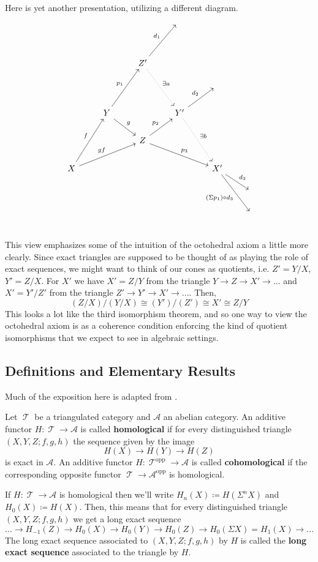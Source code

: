 \documentclass[11pt]{article}
\DeclareMathOperator{\TT}{\mathcal{T}}
\begin{document}
Here is yet another presentation, utilizing a different diagram. 
\[\begin{tikzcd}
  &   &   & {} & &  \\
  &   &   &   &   &  \\
  &   & Z' \ar[ruu,"d_1"]\ar[ddr,"\exists a",dotted] &   &  &  \\
  &   &   &   & {}  &  \\
  & Y\ar[rd,"g"] \ar[ruu,"p_1"] &   & Y'\ar[ru,"d_2"] \ar[rdd,"\exists b", dotted]&   &  \\
  &   & Z \ar[ru,"p_2"] \ar[drr,"p_3"] &   &   &  \\
X \ar[ruu,"f"]  \ar[urr,"gf"]&   &   &   & X' \ar[rd,"d_3"] \ar[rdd,"(\Sigma p_1) \circ d_3"'] &  \\
  &   &   &   &   & {} \\
  &   &   &   &   & {} \\
\end{tikzcd}\]
This view emphasizes some of the intuition of the octohedral axiom a little more clearly. Since exact triangles are supposed to be thought of as playing the role of exact sequences, we might want to think of our cones as quotients, i.e. $Z' = Y/X$, $Y' = Z/X$. For $X'$ we have $X' = Z/Y$ from the triangle $Y \to Z \to X' \to ... $ and $X' = Y'/Z'$ from the triangle $Z' \to Y' \to X' \to ...$. Then, 
\[
	(Z/X)/(Y/X) \cong (Y')/(Z') \cong X' \cong Z/Y
\]
This looks a lot like the third isomorphism theorem, and so one way to view the octohedral axiom is as a coherence condition enforcing the kind of quotient isomorphisms that we expect to see in algebraic settings.

\subsection{Definitions and Elementary Results}

Much of the exposition here is adapted from \cite[\href{https://stacks.math.columbia.edu/tag/05QN}{Section 05QN}]{stacks-project}.


\begin{defn}
Let $\TT$ be a triangulated category and $\mathcal{A}$ an abelian category. An additive functor $H: \TT \to \mathcal{A}$ is called \textbf{homological} if for every distinguished triangle $(X,Y,Z; f,g,h)$ the sequence given by the image
\[
	H(X) \to H(Y) \to H(Z)
\]
is exact in $\mathcal{A}$. An additive functor $H: \TT^{\text{opp}} \to \mathcal{A}$ is called \textbf{cohomological} if the corresponding opposite functor $\TT \to \mathcal{A}^{\text{opp}}$ is homological.

If $H: \TT \to \mathcal{A}$ is homological then we'll write $H_n(X) \coloneqq H(\Sigma^n X)$ and $H_0(X) \coloneqq H(X)$. Then, this means that for every distinguished triangle $(X,Y,Z; f,g,h)$ we get a long exact sequence 
\[
	\hdots \to H_{-1}(Z) \to H_{0}(X) \to H_0(Y) \to H_0(Z) \to H_0(\Sigma X) = H_1(X) \to \hdots
\]
The long exact sequence associated to $(X,Y,Z; f,g,h)$ by $H$ is called the \textbf{long exact sequence} associated to the triangle by $H$.
\end{defn}
\end{document}
